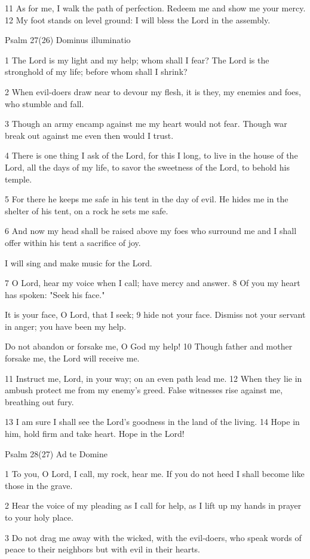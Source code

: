 11 As for me, I walk the path of perfection.
Redeem me and show me your mercy.
12 My foot stands on level ground:
I will bless the Lord in the assembly.


Psalm 27(26) Dominus illuminatio

1 The Lord is my light and my help;
whom shall I fear?
The Lord is the stronghold of my life;
before whom shall I shrink?

2 When evil-doers draw near
to devour my flesh,
it is they, my enemies and foes,
who stumble and fall.

3 Though an army encamp against me
my heart would not fear.
Though war break out against me
even then would I trust.

4 There is one thing I ask of the Lord,
for this I long,
to live in the house of the Lord,
all the days of my life,
to savor the sweetness of the Lord,
to behold his temple.

5 For there he keeps me safe in his tent
in the day of evil.
He hides me in the shelter of his tent,
on a rock he sets me safe.

6 And now my head shall be raised
above my foes who surround me
and I shall offer within his tent
a sacrifice of joy.

I will sing and make music for the Lord.

7 O Lord, hear my voice when I call;
have mercy and answer.
8 Of you my heart has spoken:
"Seek his face."

It is your face, O Lord, that I seek;
9 hide not your face.
Dismiss not your servant in anger;
you have been my help.

Do not abandon or forsake me,
O God my help!
10 Though father and mother forsake me,
the Lord will receive me.

11 Instruct me, Lord, in your way;
on an even path lead me.
12 When they lie in ambush protect me
from my enemy's greed.
False witnesses rise against me,
breathing out fury.

13 I am sure I shall see the Lord's goodness
in the land of the living.
14 Hope in him, hold firm and take heart.
Hope in the Lord!


Psalm 28(27) Ad te Domine

1 To you, O Lord, I call,
my rock, hear me.
If you do not heed I shall become
like those in the grave.

2 Hear the voice of my pleading
as I call for help,
as I lift up my hands in prayer
to your holy place.

3 Do not drag me away with the wicked,
with the evil-doers,
who speak words of peace to their neighbors
but with evil in their hearts.

